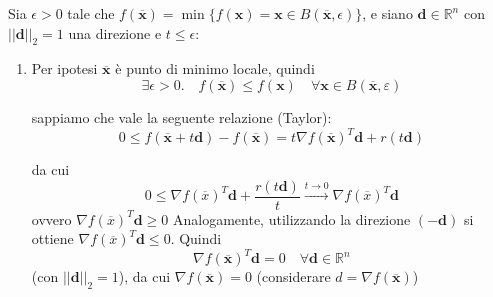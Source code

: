 \begin{thproof} Sia $ \epsilon > 0$ tale che $f(\mathbf{\overline{x}})
= \min \{ f(\mathbf{x}) = \mathbf{x} \in B(\mathbf{\overline{x}},
\epsilon)\}$, e siano $\mathbf{d} \in \mathbb{R}^{n}$ con
$||\mathbf{d}||_{2}=1$ una direzione e $ t \leq \epsilon$:
 \begin{enumerate}
  \item Per ipotesi $\mathbf{\overline{x}}$ è punto di minimo locale,
quindi
 $$ \exists \epsilon > 0.  \quad f(\mathbf{\overline{x}}) 
\leq f(\mathbf{x}) \quad \forall \mathbf{x} \in 
B(\mathbf{\mathbf{\overline{x}}}, \varepsilon)$$

sappiamo che vale la seguente relazione (Taylor):
$$ 0 \leq f(\mathbf{\overline{x}} + t\mathbf{d}) - f(\mathbf{\overline{x}}) = 
t \nabla f(\mathbf{\overline{x}})^{T}\mathbf{d} + r(t \mathbf{d}) $$

da cui
$$ 0 \leq \nabla f(\overline{x})^{T}\mathbf{d} + \dfrac{r(t\mathbf{d})}{t} \xrightarrow{t \to 0}
\nabla f(\overline{x})^{T}\mathbf{d}$$ ovvero $\nabla
f(\overline{x})^{T}\mathbf{d} \geq 0$ Analogamente, utilizzando la
direzione $(-\mathbf{d})$ si ottiene $\nabla
f(\overline{x})^{T}\mathbf{d} \leq 0$.  Quindi
$$\nabla f(\mathbf{\overline{x}})^{T}\mathbf{d} =0 \quad \forall \mathbf{d} \in \mathbb{R}^{n}$$
(con $||\mathbf{d}||_{2}=1$), da cui $\nabla
f(\mathbf{\overline{x}})=0$ (considerare $d = \nabla
f(\mathbf{\overline{x}})$)



\end{enumerate}
\end{thproof}
